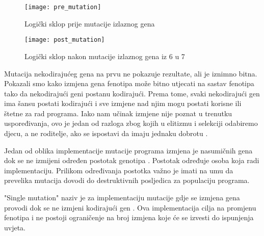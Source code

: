   \begin{figure}[h]
 	\centering
 	\texttt{[image: pre\_mutation]}
 	\caption{Logički sklop prije mutacije izlaznog gena \cite{CGPbook}}
 \end{figure} 
 \begin{figure}[h]
	\centering
	\texttt{[image: post\_mutation]}
	\caption{Logički sklop nakon mutacije izlaznog gena iz 6 u 7 \cite{CGPbook}}
\end{figure}
\par
Mutacija nekodirajućeg gena na prvu ne pokazuje rezultate, ali je iznimno bitna. Pokazali smo kako izmjena gena fenotipa može bitno utjecati na sastav fenotipa tako da nekodirajući geni postanu kodirajući. Prema tome, svaki nekodirajući gen ima šansu postati kodirajući i sve izmjene nad njim mogu postati korisne ili štetne za rad programa. Iako nam učinak izmjene nije poznat u trenutku uspoređivanja, ovo je jedan od razloga zbog kojih u elitizmu i selekciji odabiremo djecu, a ne roditelje, ako se ispostavi da imaju jednaku dobrotu \cite{CGPbook}\cite{CGPpresentation}. 
\par
Jedan od oblika implementacije mutacije programa izmjena je nasumičnih gena dok se ne izmijeni određen postotak genotipa \cite{CGPbook}. Postotak određuje osoba koja radi implementaciju. Prilikom određivanja postotka važno je imati na umu da prevelika mutacija dovodi do destruktivnih posljedica za populaciju programa. 
\par
"Single mutation" naziv je za implementaciju mutacije gdje se izmjena gena provodi dok se ne izmjeni kodirajući gen \cite{CGPpresentation}. Ova implementacija cilja na promjenu fenotipa i ne postoji ograničenje na broj izmjena koje će se izvesti do ispunjenja uvjeta. 
